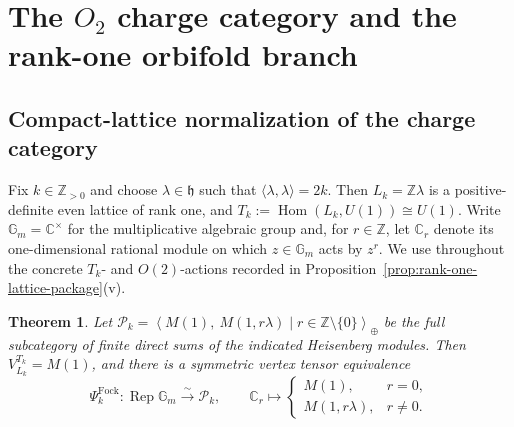\documentclass[12pt,leqno]{amsart}
\numberwithin{equation}{section} \newtheorem{thm}{Theorem}[section] \newtheorem{lem}[thm]{Lemma} \newtheorem{ex}[thm]{Example} \newtheorem{prop}[thm]{Proposition} \newtheorem{cor}[thm]{Corollary} \newtheorem{defi}[thm]{Definition} \newtheorem{rmk}[thm]{Remark} \newtheorem{notation}[thm]{Notation}
\newcommand{\Rep}{\operatorname{Rep}}
\newcommand{\Hom}{\operatorname{Hom}}
\def\Z{\mathbb{Z}} \def\N{\mathbb{N}} \def\A{\mathbb{A}} \def\C{\mathbb{C}} \def\R{\mathbb{R}} \def\Q{\mathbb{Q}} \def\F{\mathbb{F}}
\begin{document}
\section{The \texorpdfstring{$O_2$}{O2} charge category and the rank-one orbifold branch}\label{sec:o2}

\subsection{Compact-lattice normalization of the charge category}

Fix \(k\in\Z_{>0}\) and choose \(\lambda\in\mathfrak h\) such that \(\langle\lambda,\lambda\rangle=2k\). Then \(L_k=\Z\lambda\) is a positive-definite even lattice of rank one, and \(T_k:=\Hom(L_k,U(1))\cong U(1)\). Write \(\mathbb G_m=\C^\times\) for the multiplicative algebraic group and, for \(r\in\Z\), let \(\C_r\) denote its one-dimensional rational module on which \(z\in\mathbb G_m\) acts by \(z^r\). We use throughout the concrete $T_k$- and $O(2)$-actions recorded in Proposition~\ref{prop:rank-one-lattice-package}(v).

\begin{thm}\label{thm:Fock-Gm}
Let \(\mathcal P_k=\left\langle M(1),\ M(1,r\lambda)\mid r\in\Z\setminus\{0\}\right\rangle_{\oplus}\) be the full subcategory of finite direct sums of the indicated Heisenberg modules. Then \(V_{L_k}^{T_k}=M(1)\), and there is a symmetric vertex tensor equivalence
\[
\Psi_k^{\mathrm{Fock}}:\Rep\mathbb G_m\overset{\sim}{\longrightarrow}\mathcal P_k,
\qquad
\C_r\longmapsto
\begin{cases}
M(1),&r=0,\\
M(1,r\lambda),&r\ne0.
\end{cases}
\]
\end{thm}
\end{document}
